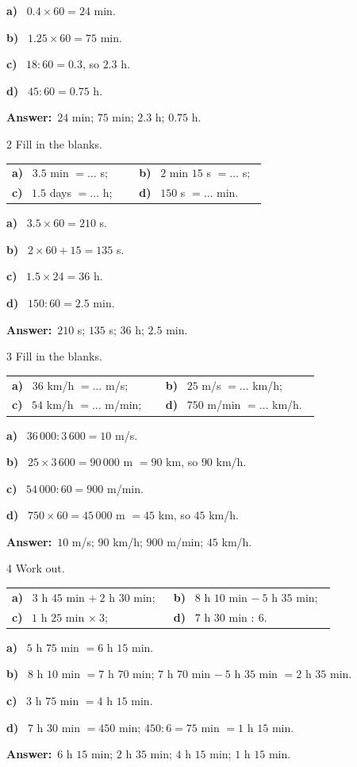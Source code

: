 \documentclass[11pt]{article}
\makeatletter
\newif\ifsol \solfalse
\renewcommand{\arraystretch}{1.35}
\providecommand{\AnsWord}{Đáp số}
\newcommand{\dapso}[1]{\par\textbf{\AnsWord:}\ #1}
\newcommand{\probsol}[1]{%
  \begin{lrbox}{\solmeasure}\begin{minipage}{\dimexpr\linewidth-24pt\relax}#1\end{minipage}\end{lrbox}%
  \ifsol
    \begin{solbox}#1\end{solbox}%
  \else
    \setlength{\solht}{\dimexpr\ht\solmeasure+\dp\solmeasure+0.85cm\relax}%
    \ifdim\solht<1.35cm\setlength{\solht}{1.35cm}\fi
    \begin{tcolorbox}[colback=white,colframe=Line,boxrule=0.8pt,arc=5pt,
      left=8pt,right=8pt,top=4pt,bottom=4pt,height=\solht]{\footnotesize\color{Slate}\itshape\WorkWord}\end{tcolorbox}%
  \fi}
\newcommand{\pa}[1]{\textbf{#1)}\ }
\newenvironment{cols2}{\par\vspace{3pt}\noindent\setlength{\tabcolsep}{0pt}\renewcommand{\arraystretch}{1.3}%
  \begin{tabular}{@{}>{\raggedright\arraybackslash\rule{0pt}{4.4ex}}p{0.48\linewidth}<{\rule[-2.3ex]{0pt}{0pt}}@{\hspace{0.03\linewidth}}>{\raggedright\arraybackslash\rule{0pt}{4.4ex}}p{0.48\linewidth}<{\rule[-2.3ex]{0pt}{0pt}}@{}}}%
  {\end{tabular}\par}
\newcommand{\gap}{\vspace{0.3cm}}
\def\WorkWord{Your work:}
\def\AnsWord{Answer}
\makeatother
\begin{document}
\probsol{
\pa{a} $0.4\times60=24$ min.\par \pa{b} $1.25\times60=75$ min.\par \pa{c} $18:60=0.3$, so $2.3$ h.\par \pa{d} $45:60=0.75$ h.
\dapso{$24$ min; $75$ min; $2.3$ h; $0.75$ h.}}
\gap
\begin{probbox}{2}{\relax}
Fill in the blanks.
\begin{cols2}
\pa{a} $3.5$ min $=\dots$ s; & \pa{b} $2$ min $15$ s $=\dots$ s;\\
\pa{c} $1.5$ days $=\dots$ h; & \pa{d} $150$ s $=\dots$ min.
\end{cols2}
\end{probbox}
\probsol{
\pa{a} $3.5\times60=210$ s.\par \pa{b} $2\times60+15=135$ s.\par \pa{c} $1.5\times24=36$ h.\par \pa{d} $150:60=2.5$ min.
\dapso{$210$ s; $135$ s; $36$ h; $2.5$ min.}}
\gap
\begin{probbox}{3}{\relax}
Fill in the blanks.
\begin{cols2}
\pa{a} $36$ km/h $=\dots$ m/s; & \pa{b} $25$ m/s $=\dots$ km/h;\\
\pa{c} $54$ km/h $=\dots$ m/min; & \pa{d} $750$ m/min $=\dots$ km/h.
\end{cols2}
\end{probbox}
\probsol{
\pa{a} $36\,000:3\,600=10$ m/s.\par
\pa{b} $25\times3\,600=90\,000$ m $=90$ km, so $90$ km/h.\par
\pa{c} $54\,000:60=900$ m/min.\par
\pa{d} $750\times60=45\,000$ m $=45$ km, so $45$ km/h.
\dapso{$10$ m/s; $90$ km/h; $900$ m/min; $45$ km/h.}}
\gap
\begin{probbox}{4}{\relax}
Work out.
\begin{cols2}
\pa{a} $3$ h $45$ min $+\ 2$ h $30$ min; & \pa{b} $8$ h $10$ min $-\ 5$ h $35$ min;\\
\pa{c} $1$ h $25$ min $\times\ 3$; & \pa{d} $7$ h $30$ min $:\ 6$.
\end{cols2}
\end{probbox}
\probsol{
\pa{a} $5$ h $75$ min $=6$ h $15$ min.\par
\pa{b} $8$ h $10$ min $=7$ h $70$ min; $7$ h $70$ min $-\ 5$ h $35$ min $=2$ h $35$ min.\par
\pa{c} $3$ h $75$ min $=4$ h $15$ min.\par
\pa{d} $7$ h $30$ min $=450$ min; $450:6=75$ min $=1$ h $15$ min.
\dapso{$6$ h $15$ min; $2$ h $35$ min; $4$ h $15$ min; $1$ h $15$ min.}}
\end{document}
